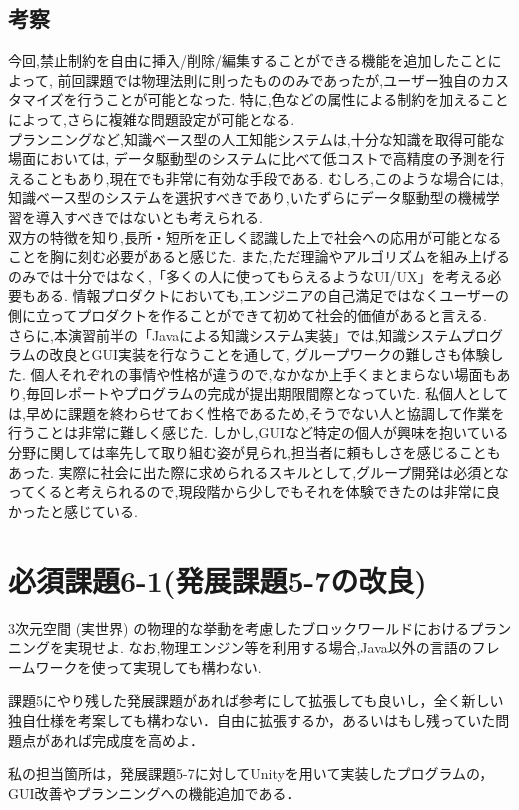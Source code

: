 \documentclass[12pt]{jarticle}
\begin{document}
\subsection{考察}
今回,禁止制約を自由に挿入/削除/編集することができる機能を追加したことによって,
前回課題では物理法則に則ったもののみであったが,ユーザー独自のカスタマイズを行うことが可能となった.
特に,色などの属性による制約を加えることによって,さらに複雑な問題設定が可能となる. \\
プランニングなど,知識ベース型の人工知能システムは,十分な知識を取得可能な場面においては,
データ駆動型のシステムに比べて低コストで高精度の予測を行えることもあり,現在でも非常に有効な手段である.
むしろ,このような場合には,知識ベース型のシステムを選択すべきであり,いたずらにデータ駆動型の機械学習を導入すべきではないとも考えられる. \\
双方の特徴を知り,長所・短所を正しく認識した上で社会への応用が可能となることを胸に刻む必要があると感じた.
また,ただ理論やアルゴリズムを組み上げるのみでは十分ではなく,「多くの人に使ってもらえるようなUI/UX」を考える必要もある.
情報プロダクトにおいても,エンジニアの自己満足ではなくユーザーの側に立ってプロダクトを作ることができて初めて社会的価値があると言える. \\
さらに,本演習前半の「Javaによる知識システム実装」では,知識システムプログラムの改良とGUI実装を行なうことを通して,
グループワークの難しさも体験した.
個人それぞれの事情や性格が違うので,なかなか上手くまとまらない場面もあり,毎回レポートやプログラムの完成が提出期限間際となっていた.
私個人としては,早めに課題を終わらせておく性格であるため,そうでない人と協調して作業を行うことは非常に難しく感じた.
しかし,GUIなど特定の個人が興味を抱いている分野に関しては率先して取り組む姿が見られ,担当者に頼もしさを感じることもあった.
実際に社会に出た際に求められるスキルとして,グループ開発は必須となってくると考えられるので,現段階から少しでもそれを体験できたのは非常に良かったと感じている.



\section{必須課題6-1(発展課題5-7の改良)}
\begin{screen}
3次元空間 (実世界) の物理的な挙動を考慮したブロックワールドにおけるプランニングを実現せよ.
なお,物理エンジン等を利用する場合,Java以外の言語のフレームワークを使って実現しても構わない.
\end{screen}
\begin{screen}
課題5にやり残した発展課題があれば参考にして拡張しても良いし，全く新しい独自仕様を考案しても構わない．自由に拡張するか，あるいはもし残っていた問題点があれば完成度を高めよ．
\end{screen}
私の担当箇所は，発展課題5-7に対してUnityを用いて実装したプログラムの，GUI改善やプランニングへの機能追加である．
\end{document}
